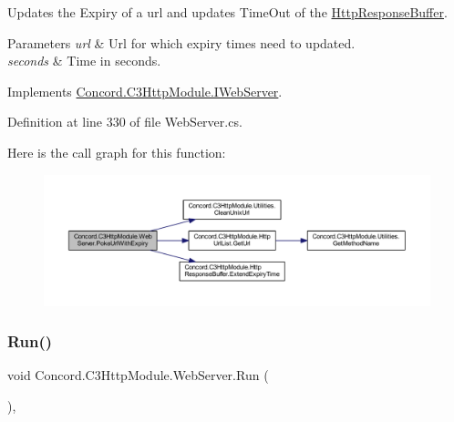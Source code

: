 Updates the Expiry of a url and updates Time\+Out of the \mbox{\hyperlink{class_concord_1_1_c3_http_module_1_1_http_response_buffer}{Http\+Response\+Buffer}}. 


\begin{DoxyParams}{Parameters}
{\em url} & Url for which expiry times need to updated.\\
\hline
{\em seconds} & Time in seconds.\\
\hline
\end{DoxyParams}


Implements \mbox{\hyperlink{interface_concord_1_1_c3_http_module_1_1_i_web_server_a4d16137e82bd2416f07c86701d8506ff}{Concord.\+C3\+Http\+Module.\+I\+Web\+Server}}.



Definition at line 330 of file Web\+Server.\+cs.

Here is the call graph for this function\+:
\nopagebreak
\begin{figure}[H]
\begin{center}
\leavevmode
\includegraphics[width=350pt]{class_concord_1_1_c3_http_module_1_1_web_server_ad3121bff4e1aeaeb05a5f1636d1e7d65_cgraph}
\end{center}
\end{figure}
\mbox{\label{class_concord_1_1_c3_http_module_1_1_web_server_a25053b2c9397975cf48565d98b9c2d9e}} 
\subsubsection{\texorpdfstring{Run()}{Run()}}
{\footnotesize\ttfamily void Concord.\+C3\+Http\+Module.\+Web\+Server.\+Run (\begin{DoxyParamCaption}{ }\end{DoxyParamCaption})\hspace{0.3cm}{\ttfamily [inline]}, {\ttfamily [private]}}



